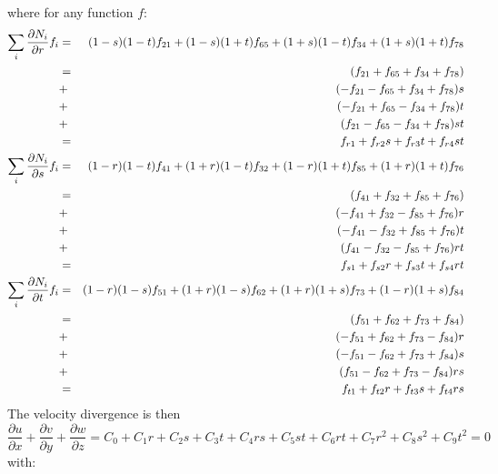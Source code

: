 where for any function $f$:
\begin{eqnarray}
\sum_i
\frac{\partial N_i}{\partial r} f_i 
&=&
 (1-s)(1-t)f_{21}
+(1-s)(1+t)f_{65}
+(1+s)(1-t)f_{34}
+(1+s)(1+t)f_{78} 
\nonumber\\
&=& ( f_{21}+f_{65}+f_{34}+f_{78}) \nonumber\\
&+& (-f_{21}-f_{65}+f_{34}+f_{78})s \nonumber\\
&+& (-f_{21}+f_{65}-f_{34}+f_{78})t \nonumber\\
&+& ( f_{21}-f_{65}-f_{34}+f_{78})st 
\nonumber\\
&=& f_{r1} + f_{r2}s + f_{r3}t + f_{r4} st \nonumber\\ 
\sum_i
\frac{\partial N_i}{\partial s} f_i 
&=&
 (1-r)(1-t)f_{41}
+(1+r)(1-t)f_{32}
+(1-r)(1+t)f_{85}
+(1+r)(1+t)f_{76} \nonumber\\
&=&
   ( f_{41}+f_{32}+f_{85}+f_{76})  \nonumber\\
&+&(-f_{41}+f_{32}-f_{85}+f_{76})r \nonumber\\
&+&(-f_{41}-f_{32}+f_{85}+f_{76})t \nonumber\\
&+&( f_{41}-f_{32}-f_{85}+f_{76})rt
\nonumber\\
&=& f_{s1} + f_{s2}r + f_{s3}t + f_{s4} rt \nonumber\\ 
\sum_i
\frac{\partial N_i}{\partial t} f_i 
&=&
 (1-r)(1-s)f_{51}
+(1+r)(1-s)f_{62}
+(1+r)(1+s)f_{73}
+(1-r)(1+s)f_{84} \nonumber\\
&=&( f_{51}+f_{62}+f_{73}+f_{84}) \nonumber\\ 
&+&(-f_{51}+f_{62}+f_{73}-f_{84})r\nonumber\\
&+&(-f_{51}-f_{62}+f_{73}+f_{84})s\nonumber\\
&+&( f_{51}-f_{62}+f_{73}-f_{84})rs
\nonumber\\
&=& f_{t1} + f_{t2}r + f_{t3}s + f_{t4} rs \nonumber
\end{eqnarray}
The velocity divergence is then 
\[
 \frac{\partial u}{\partial x} 
+\frac{\partial v}{\partial y} 
+\frac{\partial w}{\partial z} 
= C_0 +C_1 r + C_2 s + C_3 t + C_4 rs + C_5 st + C_6 rt + C_7r^2 + C_8 s^2 + C_9 t ^2 =0
\]
with:
